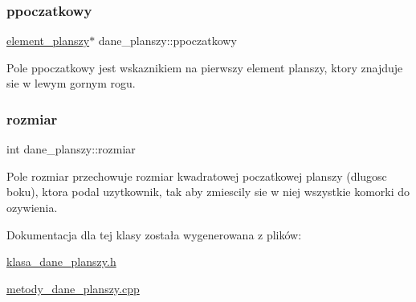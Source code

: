 \subsubsection{\texorpdfstring{ppoczatkowy}{ppoczatkowy}}
{\footnotesize\ttfamily \mbox{\hyperlink{classelement__planszy}{element\+\_\+planszy}}$\ast$ dane\+\_\+planszy\+::ppoczatkowy\hspace{0.3cm}{\ttfamily [protected]}}

Pole ppoczatkowy jest wskaznikiem na pierwszy element planszy, ktory znajduje sie w lewym gornym rogu. \mbox{\label{classdane__planszy_a529f943e243c16c773e0753ffa945223}} 
\subsubsection{\texorpdfstring{rozmiar}{rozmiar}}
{\footnotesize\ttfamily int dane\+\_\+planszy\+::rozmiar\hspace{0.3cm}{\ttfamily [protected]}}

Pole rozmiar przechowuje rozmiar kwadratowej poczatkowej planszy (dlugosc boku), ktora podal uzytkownik, tak aby zmiescily sie w niej wszystkie komorki do ozywienia. 

Dokumentacja dla tej klasy została wygenerowana z plików\+:\begin{DoxyCompactItemize}
\item 
\mbox{\hyperlink{klasa__dane__planszy_8h}{klasa\+\_\+dane\+\_\+planszy.\+h}}\item 
\mbox{\hyperlink{metody__dane__planszy_8cpp}{metody\+\_\+dane\+\_\+planszy.\+cpp}}\end{DoxyCompactItemize}
